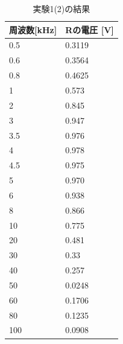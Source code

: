 \documentclass[11pt,a4paper,fleqn]{jsarticle}
\begin{document}
\begin{table}[!h]
\centering
\caption{実験1(2)の結果}
\label{cal:result1(2)}
\begin{tabular}{|l|l|}
\hline
周波数{[}kHz{]} & Rの電圧 {[}V{]} \\ \hline \hline
0.5          & 0.3119       \\ \hline
0.6          & 0.3564       \\ \hline
0.8          & 0.4625       \\ \hline
1            & 0.573        \\ \hline
2            & 0.845        \\ \hline
3            & 0.947        \\ \hline
3.5          & 0.976        \\ \hline
4            & 0.978        \\ \hline
4.5          & 0.975        \\ \hline
5            & 0.970        \\ \hline
6            & 0.938        \\ \hline
8            & 0.866        \\ \hline
10           & 0.775        \\ \hline
20           & 0.481        \\ \hline
30           & 0.33         \\ \hline
40           & 0.257        \\ \hline
50           & 0.0248       \\ \hline
60           & 0.1706       \\ \hline
80           & 0.1235       \\ \hline
100          & 0.0908       \\ \hline
\end{tabular}
\end{table}
\end{document}
